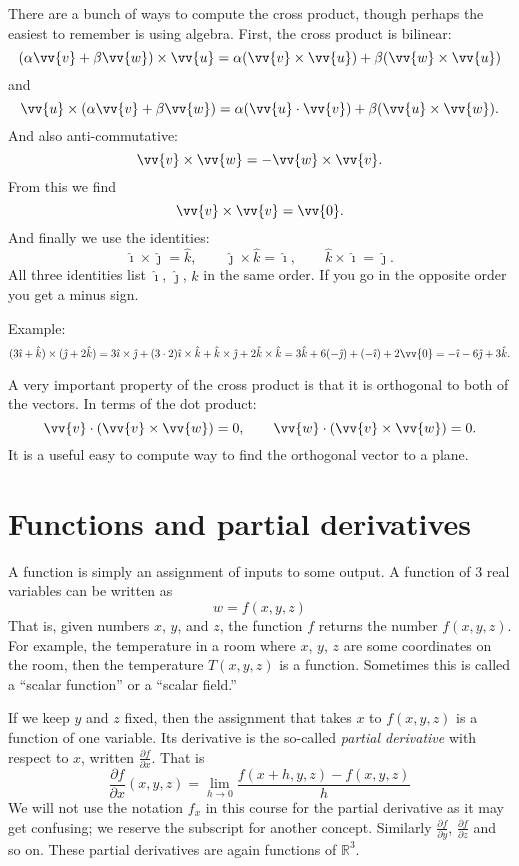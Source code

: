 \documentclass[11pt]{article}
\newcommand{\R}{{\mathbb{R}}}
\newcommand{\veci}{\hat{\imath}}
\newcommand{\vecj}{\hat{\jmath}}
\newcommand{\veck}{\hat{k}}
\begin{document}
There are a bunch of ways to compute the cross product, though perhaps the easiest to remember
is using algebra.
First, the cross product is bilinear:
$$
( \alpha \vv{v} + \beta \vv{w} ) \times \vv{u}
=
\alpha (\vv{v} \times \vv{u}) + \beta (\vv{w} \times \vv{u})
$$
and
$$
\vv{u} \times
( \alpha \vv{v} + \beta \vv{w} )
=
\alpha (\vv{u} \cdot \vv{v}) + \beta (\vv{u} \times \vv{w}) .
$$
And also anti-commutative:
$$
\vv{v} \times \vv{w} = - \vv{w} \times \vv{v} .
$$
From this we find
$$
\vv{v} \times \vv{v} = \vv{0} .
$$
And finally we use the identities:
$$
\veci \times \vecj = \veck , \qquad
\vecj \times \veck = \veci , \qquad
\veck \times \veci = \vecj .
$$
All three identities list $\veci$, $\vecj$, $\veck$ in the same order.
If you go in the opposite order you get a minus sign.

Example:
$$
(3 \veci + \veck) \times (\vecj + 2 \veck)
=
3 \veci \times \vecj + (3 \cdot 2) \veci \times \veck
+
\veck \times \vecj + 2 \veck \times \veck
=
3 \veck + 6 ( - \vecj)
+
(-\veci) + 2 \vv{0}
=
-\veci - 6\vecj + 3 \veck .
$$

A very important property of the cross product is that it is orthogonal
to both of the vectors.
In terms of the dot product:
$$
\vv{v} \cdot (\vv{v} \times \vv{w}) = 0 , \qquad
\vv{w} \cdot (\vv{v} \times \vv{w}) = 0 .
$$
It is a useful easy to compute way to find the orthogonal vector to a plane.


\section{Functions and partial derivatives}

A function is simply an assignment of inputs to some output.
A function of 3 real variables can be written as
$$
w = f(x,y,z)
$$
That is, given numbers $x$, $y$, and $z$, the function $f$ returns the number $f(x,y,z)$.
For example, the temperature in a room where $x$, $y$, $z$ are some coordinates on the room,
then the temperature $T(x,y,z)$ is a function.  Sometimes this is called a
``scalar function'' or a ``scalar field.''

If we keep $y$ and $z$ fixed, then the assignment that takes $x$ to $f(x,y,z)$ is a
function of one variable.
Its derivative is the so-called \emph{partial derivative} with respect to $x$,
written $\frac{\partial f}{\partial x}$.  That is
$$
\frac{\partial f}{\partial x}(x,y,z) = \lim_{h\to 0} \frac{f(x+h,y,z)-f(x,y,z)}{h}
$$
We will not use the notation $f_x$ in this course for the partial derivative as
it may get confusing;
we reserve the subscript for another concept.
Similarly
$\frac{\partial f}{\partial y}$,
$\frac{\partial f}{\partial z}$ and so on.  These partial derivatives are again
functions of $\R^3$.
\end{document}
